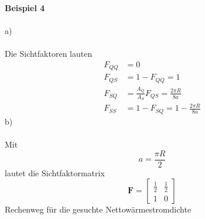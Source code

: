 \textbf{Beispiel 4}\\ \\
a) \\ \\
Die Sichtfaktoren lauten
\begin{align*}
	F_{QQ} &= 0 \\
	F_{QS} &= 1 - F_{QQ} = 1 \\
	F_{SQ} &= \frac{A_Q}{A_S}F_{QS} = \frac{2\pi R}{8a} \\
	F_{SS} &= 1 - F_{SQ} = 1 - \frac{2\pi R}{8a}
\end{align*}
b) \\ \\
Mit 
\[
	a = \frac{\pi R}{2}
\]
lautet die Sichtfaktormatrix
\[
	\textbf{F} = \begin{bmatrix}
		\frac{1}{2} & \frac{1}{2} \\
		1 & 0
	\end{bmatrix}
\]
Rechenweg für die gesuchte Nettowärmestromdichte
